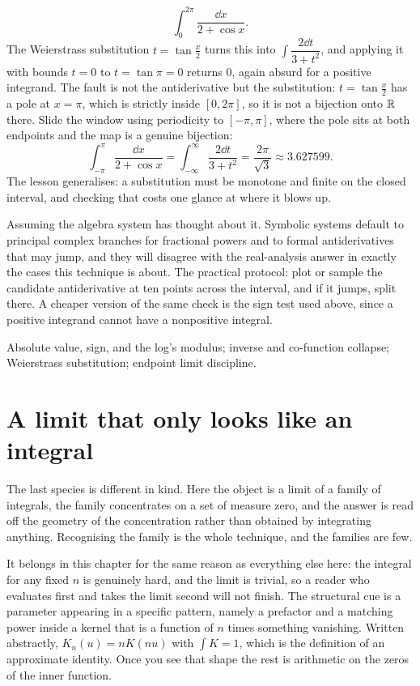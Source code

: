 \begin{worked}
\[\int_0^{2\pi}\frac{\dd x}{2+\cos x}.\]
The Weierstrass substitution $t=\tan\tfrac x2$ turns this into $\int\dfrac{2\dd t}{3+t^{2}}$, and applying it with bounds $t=0$ to $t=\tan\pi=0$ returns $0$, again absurd for a positive integrand. The fault is not the antiderivative but the substitution: $t=\tan\tfrac x2$ has a pole at $x=\pi$, which is strictly inside $[0,2\pi]$, so it is not a bijection onto $\mathbb{R}$ there. Slide the window using periodicity to $[-\pi,\pi]$, where the pole sits at both endpoints and the map is a genuine bijection:
\[\int_{-\pi}^{\pi}\frac{\dd x}{2+\cos x}=\int_{-\infty}^{\infty}\frac{2\dd t}{3+t^{2}}=\frac{2\pi}{\sqrt3}\approx3.627599.\]
The lesson generalises: a substitution must be monotone and finite on the closed interval, and checking that costs one glance at where it blows up.
\end{worked}

\begin{trap}
Assuming the algebra system has thought about it. Symbolic systems default to principal complex branches for fractional powers and to formal antiderivatives that may jump, and they will disagree with the real-analysis answer in exactly the cases this technique is about. The practical protocol: plot or sample the candidate antiderivative at ten points across the interval, and if it jumps, split there. A cheaper version of the same check is the sign test used above, since a positive integrand cannot have a nonpositive integral.
\end{trap}

\begin{seealsob}Absolute value, sign, and the log's modulus; inverse and co-function collapse; Weierstrass substitution; endpoint limit discipline.\end{seealsob}

\section{A limit that only looks like an integral}

The last species is different in kind. Here the object is a limit of a family of integrals, the family concentrates on a set of measure zero, and the answer is read off the geometry of the concentration rather than obtained by integrating anything. Recognising the family is the whole technique, and the families are few.

It belongs in this chapter for the same reason as everything else here: the integral for any fixed $n$ is genuinely hard, and the limit is trivial, so a reader who evaluates first and takes the limit second will not finish. The structural cue is a parameter appearing in a specific pattern, namely a prefactor and a matching power inside a kernel that is a function of $n$ times something vanishing. Written abstractly, $K_{n}(u)=nK(nu)$ with $\int K=1$, which is the definition of an approximate identity. Once you see that shape the rest is arithmetic on the zeros of the inner function.

